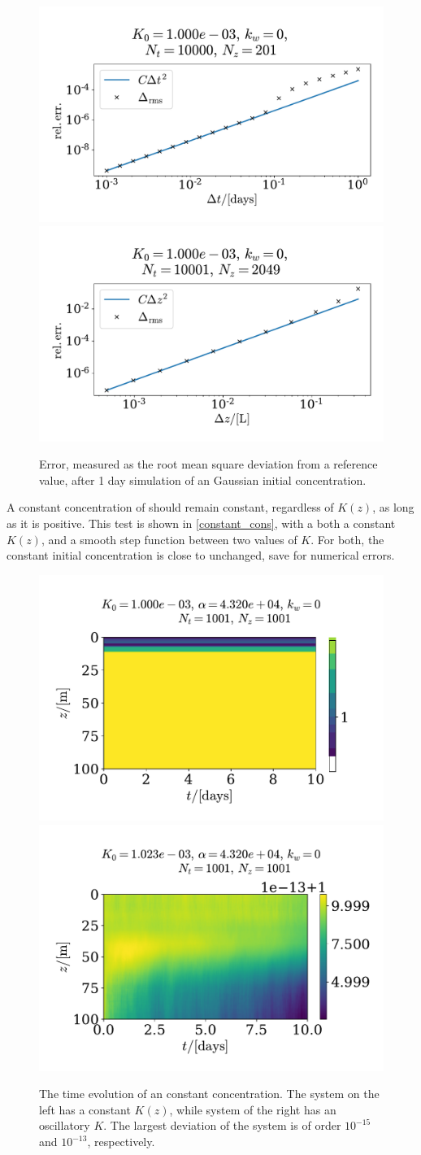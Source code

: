 \documentclass{article}
\begin{document}
    \begin{figure}
        \centering
        \includegraphics[width=.49\textwidth]{../plots/conv_test_t}
        \includegraphics[width=.49\textwidth]{../plots/conv_test_z}
        \caption{Error, measured as the root mean square deviation from a reference value, after 1 day simulation of an Gaussian initial concentration.}
        \label{convergence test}
    \end{figure}

    A constant concentration of  should remain constant, regardless of $K(z)$, as long as it is positive. This test is shown in \autoref{constant_cons}, with a both a constant $K(z)$, and a smooth step function between two values of $K$. For both, the constant initial concentration is close to unchanged, save for numerical errors.

    \begin{figure}
        \centering
        \includegraphics[width=.49\textwidth]{../plots/test1}
        \includegraphics[width=.49\textwidth]{../plots/test1_varK}
        \caption{The time evolution of an constant concentration. The system on the left has a constant $K(z)$, while system of the right has an oscillatory $K$. The largest deviation of the system is of order $10^{-15}$ and $10^{-13}$, respectively.}
        \label{constant_cons}
    \end{figure}
\end{document}
